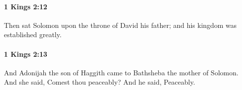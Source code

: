 		\paragraph{1 Kings 2:12} %
			\label{1KINGS-2-12}

			Then sat Solomon upon the throne of David his father; and his kingdom was established greatly.


		\paragraph{1 Kings 2:13} %
			\label{1KINGS-2-13}

			And Adonijah the son of Haggith came to Bathsheba the mother of Solomon. And she said, Comest thou peaceably? And he said, Peaceably.


